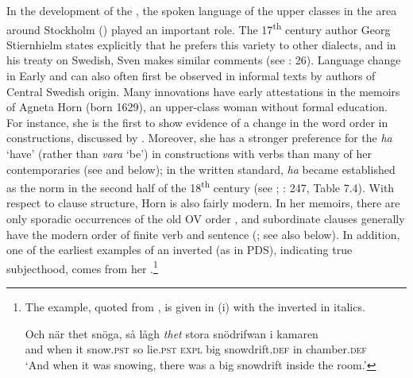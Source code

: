 \documentclass[output=paper]{langscibook}
\begin{document}
In the development of the , the spoken language of the upper classes in the area around Stockholm () played an important role. The 17\textsuperscript{th} century author Georg Stiernhielm states explicitly that he prefers this variety to other dialects, and in his treaty on Swedish, Sven \citet{Hof1753} makes similar comments (see \citealt{Widmark2000}: 26). Language change in Early and  can also often first be observed in informal texts by authors of Central Swedish origin. Many innovations have early attestations in the memoirs of Agneta Horn (born 1629), an upper-class woman without formal education. For instance, she is the first to show evidence of a change in the word order in  constructions, discussed by . Moreover, she has a stronger preference for the  \textit{ha} ‘have’ (rather than \textit{vara} ‘be’) in  constructions with  verbs than many of her contemporaries (see \citealt{Larsson2009} and below); in the written standard, \textit{ha} became established as the norm in the second half of the 18\textsuperscript{th} century (see \citealt{Johannisson1945}; \citealt{Larsson2009}: 247, Table 7.4). With respect to clause structure, Horn is also fairly modern. In her memoirs, there are only sporadic occurrences of the old OV order \citep{Petzell2011}, and subordinate clauses generally have the modern order of finite verb and sentence  (\citealt{Falk1993}; see also  below). In addition, one of the earliest examples of an inverted  (as in PDS), indicating true subjecthood, comes from her \citep[268]{Falk1993}.\footnote{The example, quoted from \citet[268]{Falk1993}, is given in (i) with the inverted  in italics.

\ea\gll Och  när    thet  snöga,    så  lågh \textit{thet} stora  snödrifwan    i    kamaren\\
        and  when  it      snow.\textsc{pst}  so  lie.\textsc{pst}  \textsc{expl}  big    snowdrift.\textsc{def} in  chamber.\textsc{def}\\
   \glt ‘And when it was snowing, there was a big snowdrift inside the room.’
   \z}
\end{document}
